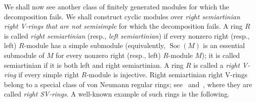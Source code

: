 \documentclass[11pt,a4paper]{amsart}
\theoremstyle{plain}
\theoremstyle{definition}
\theoremstyle{remark}
\newcommand{\Soc}{\operatorname{Soc}}
\begin{document}
We shall now see another class of finitely generated {modules} for which the decomposition fails.
We shall construct cyclic modules over \emph{right semiartinian right V-rings that are not semisimple} for which the decomposition fails. A ring $R$ is called \emph{right semiartinian} (resp., \emph{left semiartinian}) if every nonzero right (resp., left) $R$-module has a simple submodule (equivalently, $ \Soc(M) $ is an essential submodule of $ M $ for every nonzero right (resp., left) $R$-module $ M $); it is called semiartinian if it is both left and right semiartinian. A ring $R$ is called a \emph{right V-ring} if every simple right $R$-module is injective. Right semiartinian right V-rings belong to a special class of von Neumann regular rings; see~\cite[Sections 6.1 and 16, Theorem 16.14]{Jain-et-al:CyclicModulesAndTheStructureOfRings} and~\cite{Baccella:SemiArtinianVRingsAndSemiArtinianVonNeumannRegularRings},  where they are called \emph{right SV-rings}. A well-known example of such rings is the following.
\end{document}
